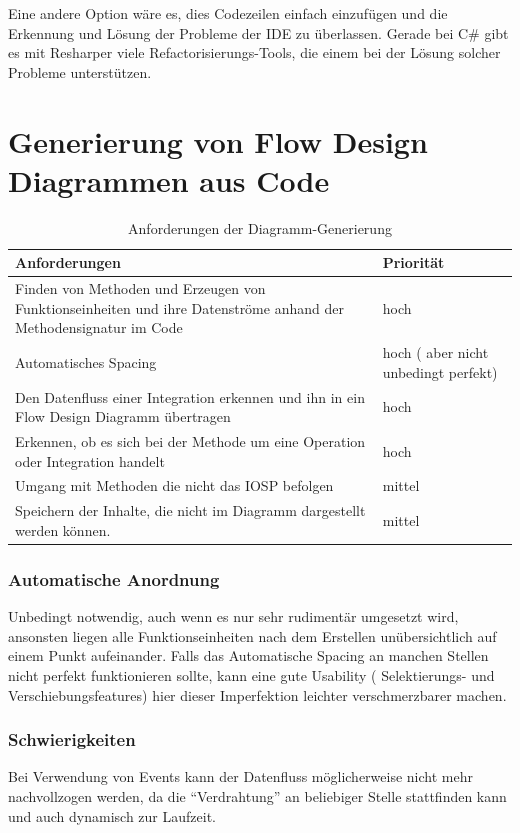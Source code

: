   Eine andere Option wäre es, dies Codezeilen einfach einzufügen und die Erkennung und Lösung der
  Probleme der IDE zu überlassen. Gerade bei C\# gibt es mit Resharper viele
  Refactorisierungs-Tools, die einem bei der Lösung solcher Probleme unterstützen.



\section{Generierung von Flow Design Diagrammen aus Code}
\begin{table}[H]
\begin{tabularx}{\textwidth}{X|l}
Anforderungen & Priorität\\
 \hline \hline
Finden von Methoden und Erzeugen von Funktionseinheiten und ihre Datenströme anhand der Methodensignatur im Code & hoch\\ \hline
Automatisches Spacing & hoch ( aber nicht unbedingt perfekt)\\ \hline
Den Datenfluss einer Integration erkennen und ihn in ein Flow Design Diagramm übertragen & hoch\\ \hline
Erkennen, ob es sich bei der Methode um eine Operation oder Integration handelt & hoch\\ \hline
Umgang mit Methoden die nicht das IOSP befolgen & mittel\\ \hline
Speichern der Inhalte, die nicht im Diagramm dargestellt werden können. & mittel\\ \hline
\end{tabularx}
\caption{Anforderungen der Diagramm-Generierung}
\end{table}



\subsubsection{Automatische Anordnung}

Unbedingt notwendig, auch wenn es nur sehr rudimentär umgesetzt wird, ansonsten liegen
alle Funktionseinheiten nach dem Erstellen unübersichtlich auf einem Punkt aufeinander.
Falls das Automatische Spacing an manchen Stellen nicht perfekt funktionieren
sollte, kann eine gute Usability ( Selektierungs- und Verschiebungsfeatures)
hier dieser Imperfektion leichter verschmerzbarer machen.

\subsubsection{Schwierigkeiten}
Bei Verwendung von Events kann der Datenfluss möglicherweise nicht mehr nachvollzogen werden, da die \enquote{Verdrahtung} an beliebiger Stelle stattfinden kann und auch dynamisch zur Laufzeit.


